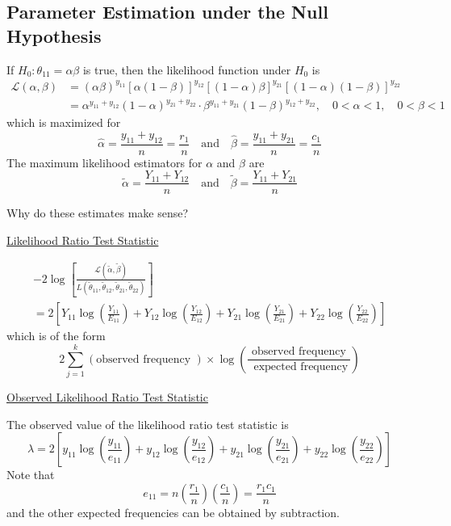 \documentclass[oneside]{book}
\begin{document}
\subsection{Parameter Estimation under the Null Hypothesis}

If $H_{0}: \theta_{11}=\alpha \beta$ is true, then the likelihood function under $H_{0}$ is
\[
    \begin{aligned}
        \mathcal{L}(\alpha, \beta) & =(\alpha \beta)^{y_{11}}[\alpha(1-\beta)]^{y_{12}}[(1-\alpha) \beta]^{y_{21}}[(1-\alpha)(1-\beta)]^{y_{22}}                               \\
                                   & =\alpha^{y_{11}+y_{12}}(1-\alpha)^{y_{21}+y_{22}} \cdot \beta^{y_{11}+y_{21}}(1-\beta)^{y_{12}+y_{22}}, \quad 0<\alpha<1, \quad 0<\beta<1
    \end{aligned}
\]
which is maximized for
\[
    \hat{\alpha}=\frac{y_{11}+y_{12}}{n}=\frac{r_{1}}{n} \quad \text{and} \quad \hat{\beta}=\frac{y_{11}+y_{21}}{n}=\frac{c_{1}}{n}
\]
The maximum likelihood estimators for $\alpha$ and $\beta$ are
\[
    \tilde{\alpha}=\frac{Y_{11}+Y_{12}}{n} \quad \text{and} \quad \tilde{\beta}=\frac{Y_{11}+Y_{21}}{n}
\]

Why do these estimates make sense?

\underline{Likelihood Ratio Test Statistic}

\[
    \begin{array}{c}
        -2 \log \left[\frac{\mathcal{L}(\tilde{\alpha}, \tilde{\beta})}{L\left(\tilde{\theta}_{11}, \tilde{\theta}_{12}, \tilde{\theta}_{21}, \tilde{\theta}_{22}\right)}\right] \\
        =2\left[Y_{11} \log \left(\frac{Y_{11}}{E_{11}}\right)+Y_{12} \log \left(\frac{Y_{12}}{E_{12}}\right)+Y_{21} \log \left(\frac{Y_{21}}{E_{21}}\right)+Y_{22} \log \left(\frac{Y_{22}}{E_{22}}\right)\right]
    \end{array}
\]
which is of the form
\[
    2 \sum_{j=1}^{k}(\text{observed frequency }) \times \log \left(\frac{\text{ observed frequency }}{\text{ expected frequency}}\right)
\]

\underline{Observed Likelihood Ratio Test Statistic}

The observed value of the likelihood ratio test statistic is
\[
    \lambda=2\left[y_{11} \log \left(\frac{y_{11}}{e_{11}}\right)+y_{12} \log \left(\frac{y_{12}}{e_{12}}\right)+y_{21} \log \left(\frac{y_{21}}{e_{21}}\right)+y_{22} \log \left(\frac{y_{22}}{e_{22}}\right)\right]
\]
Note that
\[
    e_{11}=n\left(\frac{r_{1}}{n}\right)\left(\frac{c_{1}}{n}\right)=\frac{r_{1} c_{1}}{n}
\]
and the other expected frequencies can be obtained by subtraction.
\end{document}
